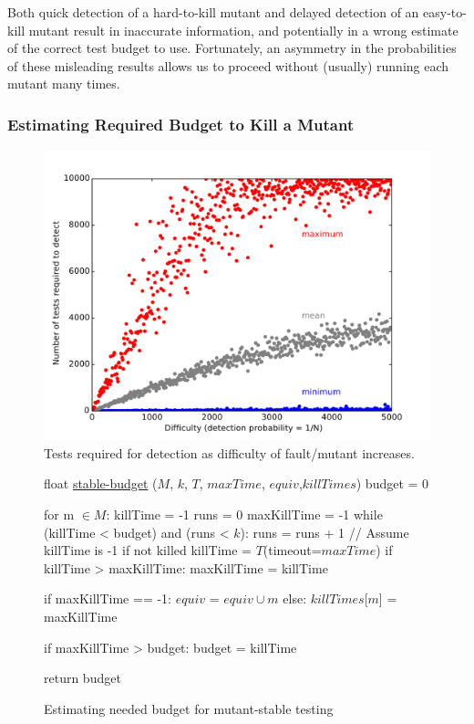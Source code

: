\documentclass{svjour3}
\begin{document}
Both quick detection of a hard-to-kill mutant and delayed detection of
an easy-to-kill mutant result in inaccurate
information, and potentially in a wrong estimate of the correct test
budget to use.  Fortunately, an asymmetry in the probabilities of
these misleading results allows us to proceed without (usually) running each
mutant many times.

\subsubsection{Estimating Required Budget to Kill a Mutant}


\begin{figure}
\includegraphics[width=\columnwidth]{probsmodel}
\caption{Tests required for detection as difficulty of fault/mutant increases.}
\label{fig:probmodel}
\end{figure}


\begin{figure}
{%
\begin{code}
float {\underline{stable-budget}} ($M$, $k$, $T$, $maxTime$, $equiv$,$killTimes$)
\vspace{0.1in}
  budget = 0

  for m $\in M$:
     killTime = -1
     runs = 0
     maxKillTime = -1
     while (killTime < budget) and (runs < $k$):
         runs = runs + 1
         // Assume killTime is -1 if not killed
         killTime = $T$(timeout=$maxTime$)
         if killTime > maxKillTime:
            maxKillTime = killTime

     if maxKillTime == -1:
        $equiv$ = $equiv \cup m$
     else:
        $killTimes$[$m$] = maxKillTime

     if maxKillTime > budget:
        budget = killTime
  
  return budget
\end{code}
}
\caption{Estimating needed budget for mutant-stable testing}
\label{alg:testdepth}
\end{figure}
\end{document}

